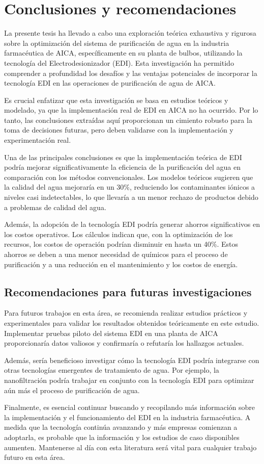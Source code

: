 \chapter{Conclusiones y recomendaciones}


La presente tesis ha llevado a cabo una
exploración teórica exhaustiva y rigurosa sobre la
optimización del sistema de purificación de agua en la industria
farmacéutica de AICA, específicamente en su planta de bulbos,
utilizando la tecnología del Electrodesionizador (EDI).
Esta investigación ha permitido comprender a profundidad
los desafíos y las ventajas potenciales de incorporar la
tecnología EDI en las operaciones de purificación de agua de AICA.

Es crucial enfatizar que esta investigación se basa en estudios teóricos y
modelado, ya que la implementación real de EDI en AICA no ha ocurrido.
Por lo tanto, las conclusiones extraídas aquí proporcionan un cimiento
robusto para la toma de decisiones futuras, pero deben validarse con la
implementación y experimentación real.

Una de las principales conclusiones es que la implementación teórica de
EDI podría mejorar significativamente la eficiencia de la purificación
del agua en comparación con los métodos convencionales. Los modelos
teóricos sugieren que la calidad del agua mejoraría en un 30\%,
reduciendo los contaminantes iónicos a niveles casi indetectables, lo que
llevaría a un menor rechazo de productos debido a problemas de calidad del agua.

Además, la adopción de la tecnología EDI podría generar ahorros significativos
en los costos operativos. Los cálculos indican que, con la optimización de
los recursos, los costos de operación podrían disminuir en hasta un 40\%.
Estos ahorros se deben a una menor necesidad de químicos para el proceso de
purificación y a una reducción en el mantenimiento y los costos de energía.

\section*{Recomendaciones para futuras investigaciones}


Para futuros trabajos en esta área, se recomienda realizar estudios prácticos y
experimentales para validar los resultados obtenidos teóricamente en este estudio.
Implementar pruebas piloto del sistema EDI en una planta de AICA proporcionaría
datos valiosos y confirmaría o refutaría los hallazgos actuales.

Además, sería beneficioso investigar cómo la tecnología EDI podría integrarse
con otras tecnologías emergentes de tratamiento de agua. Por ejemplo,
la nanofiltración podría
trabajar en conjunto con la tecnología EDI para optimizar aún más el
proceso de purificación de agua.

Finalmente, es esencial continuar buscando y recopilando más información
sobre la implementación y el funcionamiento del EDI en la industria farmacéutica.
A medida que la tecnología continúa avanzando y más empresas comienzan a adoptarla,
es probable que la información y los estudios de caso disponibles aumenten.
Mantenerse al día con esta literatura será vital para cualquier trabajo futuro en esta área.